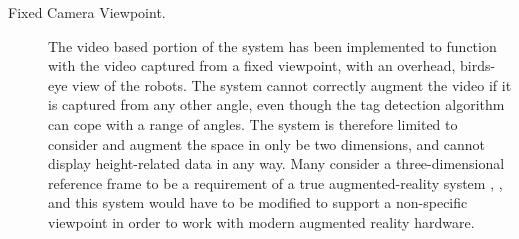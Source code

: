 \begin{description}
\item [Fixed Camera Viewpoint.] The video based portion of the system has been implemented to function with the video captured from a fixed viewpoint, with an overhead, birds-eye view of the robots. The system cannot correctly augment the video if it is captured from any other angle, even though the tag detection algorithm can cope with a range of angles. The system is therefore limited to consider and augment the space in only be two dimensions, and cannot display height-related data in any way. Many consider a three-dimensional reference frame to be a requirement of a true augmented-reality system \cite{Azuma:1997}, \cite{Billinghurst:2014}, and this system would have to be modified to support a non-specific viewpoint in order to work with modern augmented reality hardware.
\end{description}

